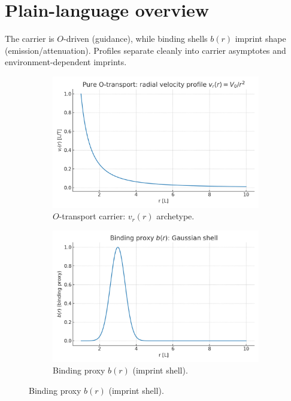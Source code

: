 \documentclass[12pt,a4paper,oneside]{scrreprt}
\begin{document}
\section*{Plain-language overview}
The carrier is $O$-driven (guidance), while binding shells $b(r)$ imprint shape (emission/attenuation). Profiles separate cleanly into carrier asymptotes and environment-dependent imprints.

\begin{figure}[htbp]\centering
  \begin{subfigure}[t]{0.49\linewidth}
    \includegraphics[width=\linewidth]{Otransport_vr_profile.png}
    \caption{$O$-transport carrier: $v_r(r)$ archetype.}
    \label{fig:carrier:vr}
  \end{subfigure}\hfill
  \begin{subfigure}[t]{0.49\linewidth}
    \includegraphics[width=\linewidth]{binding_proxy_shell.png}
    \caption{Binding proxy $b(r)$ (imprint shell).}
    \label{fig:carrier:b}
  \end{subfigure}


\end{figure}
\end{document}
